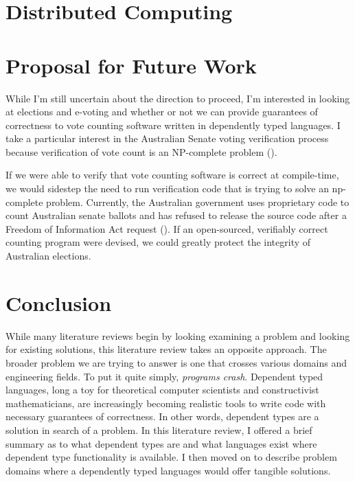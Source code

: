 \section{Distributed Computing}


\section{Proposal for Future Work}

While I'm still uncertain about the direction to proceed, I'm interested in
looking at elections and e-voting and whether or not we can provide guarantees
of correctness to vote counting software written in dependently typed languages.
I take a particular interest in the Australian Senate voting verification
process because verification of vote count is an NP-complete problem
(\cite{aus_senate}). 

If we were able to verify that vote counting software is correct at
compile-time, we would sidestep the need to run verification code that is trying
to solve an np-complete problem. Currently, the Australian government uses
proprietary code to count Australian senate ballots and has refused to release
the source code after a Freedom of Information Act request
(\cite{aus_senate_news}). If an open-sourced, verifiably correct counting
program were devised, we could greatly protect the integrity of Australian
elections. 

\section{Conclusion}
While many literature reviews begin by looking examining a problem and looking
for existing solutions, this literature review takes an opposite approach. The
broader problem we are trying to answer is one that crosses various domains and
engineering fields. To put it quite simply, \textit{programs crash}. Dependent
typed languages, long a toy for theoretical computer scientists and
constructivist mathematicians, are increasingly becoming realistic tools to
write code with necessary guarantees of correctness. In other words, dependent
types are a solution in search of a problem. In this literature review, I
offered a brief summary as to what dependent types are and what languages exist
where dependent type functionality is available. I then moved on to describe
problem domains where a dependently typed languages would offer tangible solutions.